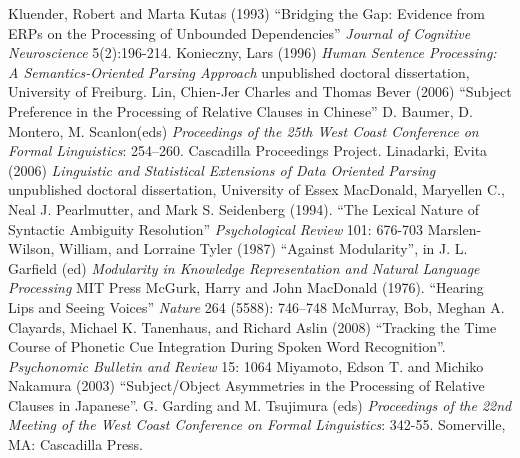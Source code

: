 \documentclass[a4paper]{article}
\begin{document}
Kluender, Robert and Marta Kutas (1993) ``Bridging the Gap: Evidence from ERPs on the Processing of Unbounded Dependencies'' {\it Journal of Cognitive Neuroscience} 5(2):196-214.
\newline
\newline
Konieczny, Lars (1996) {\it Human Sentence Processing:
A Semantics-Oriented Parsing Approach} unpublished doctoral dissertation, University of Freiburg.
\newline
\newline
Lin, Chien-Jer Charles  and Thomas Bever (2006) ``Subject Preference in the Processing of Relative Clauses in Chinese'' D. Baumer, D. Montero, M. Scanlon(eds) {\it Proceedings of the 25th West Coast Conference on Formal Linguistics}: 254–260. Cascadilla Proceedings Project.
\newline
\newline
Linadarki, Evita (2006) {\it Linguistic and Statistical Extensions of Data
Oriented Parsing} unpublished doctoral dissertation, University of Essex
\newline
\newline
MacDonald, Maryellen C., 
Neal J. Pearlmutter,
and Mark S. Seidenberg  (1994).  ``The Lexical Nature of Syntactic 
Ambiguity Resolution'' 
{\it Psychological Review} 101: 676-703
\newline
\newline
Marslen-Wilson, William, and Lorraine Tyler (1987) ``Against Modularity'', in J. L.
Garfield (ed) {\it Modularity in Knowledge Representation and Natural Language Processing}
MIT Press
\newline
\newline
McGurk, Harry and John MacDonald (1976). ``Hearing Lips and Seeing Voices'' {\it Nature} 264 (5588): 746–748
\newline
\newline
McMurray, Bob, Meghan A. Clayards, Michael K. Tanenhaus, and Richard Aslin  (2008) ``Tracking the Time Course of Phonetic Cue Integration During Spoken Word Recognition''. {\it Psychonomic Bulletin and Review} 15: 1064
\newline
\newline
Miyamoto, Edson T. and
Michiko Nakamura (2003) ``Subject/Object
Asymmetries
in the Processing
of Relative Clauses
in Japanese''.  G. Garding and M. Tsujimura (eds) {\it Proceedings of the 22nd Meeting of the West Coast Conference on Formal Linguistics}:  342-55. Somerville, MA: 
Cascadilla Press. 
\newline
\newline
\end{document}
